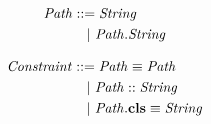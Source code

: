 \begin{figure}[t]
\begin{subfigure}[c]{1\textwidth}
\centering
\begin{subfigure}[c]{0.45\textwidth}
\begin{align*}
\mathit{Path} &::=
     \mathit{String}\\
  &\quad|\ \mathit{Path.String}
\end{align*}
\end{subfigure}
\begin{subfigure}[c]{0.45\textwidth}
\begin{align*}
\mathit{Constraint} &::=
     \mathit{Path} \equiv \mathit{Path}\\
  &\quad|\ \mathit{Path} :: \mathit{String}\\
  &\quad|\ \mathit{Path}.\textbf{cls} \equiv \mathit{String}
\end{align*}
\end{subfigure}
%

\end{subfigure}
\end{figure}
